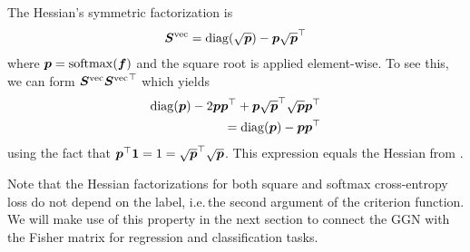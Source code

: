 \begin{example}\label{ex:crossentropyloss_hessian_factorization}
  The Hessian's symmetric factorization is \citep[e.g.][]{papyan2019measurements}
  \begin{align*}
    {\bm{S}}^{\operatorname{vec}} = \operatorname{diag}(\sqrt{{\bm{p}}}) - {\bm{p}} \sqrt{{\bm{p}}}^{\top}
  \end{align*}
  where ${\bm{p}} = \mathrm{softmax}({\bm{f}})$ and the square root is applied element-wise.
  To see this, we can form ${\bm{S}}^{\operatorname{vec}} {{\bm{S}}^{\operatorname{vec}}}^{\top}$ which yields
  \begin{align*}
    \operatorname{diag}({\bm{p}}) - 2 {\bm{p}} {\bm{p}}^{\top} + {\bm{p}} \sqrt{{\bm{p}}}^{\top} \sqrt{{\bm{p}}} {\bm{p}}^{\top}
    \\
    = \operatorname{diag}({\bm{p}}) - {\bm{p}} {\bm{p}}^{\top}
  \end{align*}
  using the fact that ${\bm{p}}^{\top} {\bm{1}} = 1 = \sqrt{{\bm{p}}}^{\top} \sqrt{{\bm{p}}}$.
  This expression equals the Hessian from .
\end{example}
Note that the Hessian factorizations for both square and softmax cross-entropy loss do not depend on the label, i.e.\,the second argument of the criterion function.
We will make use of this property in the next section to connect the GGN with the Fisher matrix for regression and classification tasks.

\switchcolumn[1]
\switchcolumn[0]
